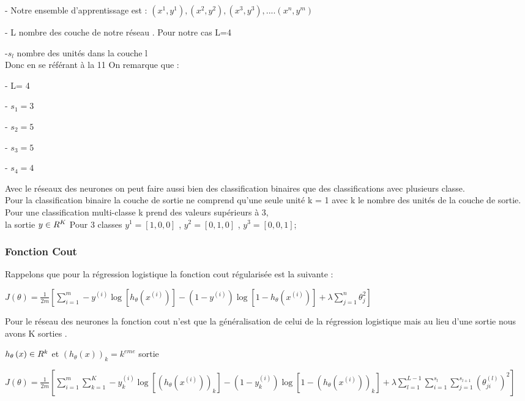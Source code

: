  - Notre ensemble d'apprentissage est : {$({x}^{1},{y}^{1}),({x}^{2},{y}^{2}),({x}^{3},{y}^{3}),....({x}^{n},{y}^{m})$}
 
 - L nombre des couche de notre réseau . Pour notre cas L=4
 
 -${s}_{l}$ nombre des unités dans la couche l\\
 Donc en se référant à la \figurename{ 11} On remarque que :
 
 - L= 4
 
 - ${s}_{1} = 3$
 
 - ${s}_{2} = 5$
 
 - ${s}_{3} = 5$
 
 - ${s}_{4} = 4$
 
 Avec le réseaux des neurones on peut faire aussi bien des classification binaires que des classifications avec plusieurs classe.\\
 Pour la classification binaire la couche de sortie ne comprend qu'une seule unité k = 1 avec k le nombre des unités de la couche  de sortie.\\
 Pour une classification multi-classe k prend des valeurs supérieurs à 3,\\ la sortie  $y \in {\LARGE R}^{K} $  Pour 3 classes ${y}^{1} = [1,0,0]$ , ${y}^{2} = [0,1,0]$ , ${y}^{3} = [0,0,1]$; 
 \subsubsection{Fonction Cout}
 
 Rappelons que pour la régression logistique la fonction cout régularisée est la suivante :
 
\begin{center}
 	$J\left({\theta }\right)=\frac{1}{2m}[\sum _{i=1}^{m}-{y}^{(i)}\log [{h}_{\theta}\left({x}^{(i)}\right)] -(1-{y}^{(i)})\log [1-{h}_{\theta}\left({x}^{(i)}\right)] + {\lambda} \sum _{j=1}^{n}{{\theta}_{j}^{2}}]$
\end{center} 
 Pour le réseau des neurones la  fonction cout n'est que la généralisation de celui de la régression logistique mais au lieu d'une sortie nous avons K sorties .
 
 ${h}_{\theta}\left(x\right) \in {\LARGE R}^{k} $  et 
 $({h}_{\theta}\left(x\right))_{k} = {k}^{eme} $  sortie 
 
 
  	$J\left({\theta }\right)=\frac{1}{2m}[\sum _{i=1}^{m}\sum _{k=1}^{K}-{y}_{k}^{(i)}\log [({h}_{\theta}\left({x}^{(i)}\right))_{k}] -(1-{y}_{k}^{(i)})\log [1-({h}_{\theta}\left({x}^{(i)}\right))_{k}] + {\lambda} \sum _{l=1}^{L-1}\sum _{i=1}^{{s}_{l}}\sum _{j=1}^{{s}_{l+1}}{({\theta}_{ji}^{(l)})^{2}}]$ \\


